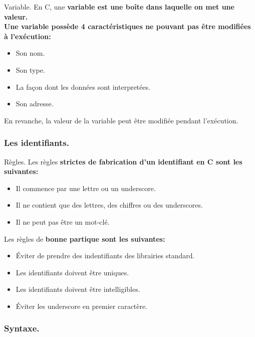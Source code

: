 \documentclass[french, 11pt]{article}
\begin{document}
\begin{defi}{Variable.}{}
    En C, une \bf{variable} est une boîte dans laquelle on met une valeur.\\
    Une variable possède 4 caractéristiques ne pouvant pas être modifiées à l'exécution:
    \begin{itemize}[topsep=0pt,itemsep=-0.9 ex, label=---]
        \item Son nom.
        \item Son type.
        \item La façon dont les données sont interpretées.
        \item Son adresse.
    \end{itemize}
    En revanche, la valeur de la variable peut être modifiée pendant l'exécution.
\end{defi}

\subsubsection{Les identifiants.}

\begin{defi}{Règles.}{}
    Les règles \bf{strictes} de fabrication d'un identifiant en C sont les suivantes:
    \begin{itemize}[topsep=0pt,itemsep=-0.9 ex, label=---]
        \item Il commence par une lettre ou un underscore.
        \item Il ne contient que des lettres, des chiffres ou des underscores.
        \item Il ne peut pas être un mot-clé.
    \end{itemize}\vspace{0.25cm}
    Les règles de \bf{bonne partique} sont les suivantes:
    \begin{itemize}[topsep=0pt,itemsep=-0.9 ex, label=---]
        \item Éviter de prendre des indentifiants des librairies standard.
        \item Les identifiants doivent être uniques.
        \item Les identifiants doivent être intelligibles.
        \item Éviter les underscore en premier caractère.
    \end{itemize}
\end{defi}

\subsubsection{Syntaxe.}
\end{document}
